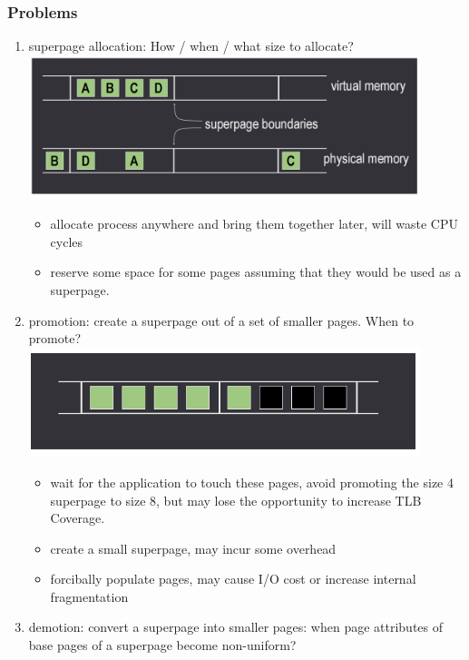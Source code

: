 \documentclass[12pt]{article}
\begin{document}
\subsubsection{Problems}
\begin{enumerate}
    \item superpage allocation: How / when / what size to allocate? \newline
    \includegraphics[width=0.9\textwidth]{SuperpageAllocation.png} 
    \begin{itemize}
        \item allocate process anywhere and bring them together later, will waste CPU cycles
        \item reserve some space for some pages assuming that they would be used as a superpage.
    \end{itemize}
    \item promotion: create a superpage out of a set of smaller pages. When to promote? \newline
    \includegraphics[width=0.9\textwidth]{SuperpagePromotion.png} 
    \begin{itemize}
        \item wait for the application to touch these pages, avoid promoting the size 4 superpage to size 8, but may lose the opportunity to increase TLB Coverage.
        \item create a small superpage, may incur some overhead
        \item forcibally populate pages, may cause I/O cost or increase internal fragmentation
    \end{itemize}
    \item demotion: convert a superpage into smaller pages: when page attributes of base pages of a superpage become non-uniform?

\end{enumerate}
\end{document}
